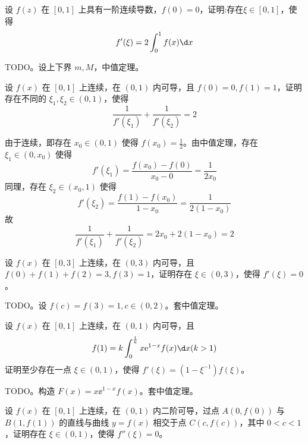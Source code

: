 \begin{problem}[000009]
设 $f(z)$ 在 $[0,1]$ 上具有一阶连续导数，$f(0) = 0$，证明:存在$\xi \in [0,1]$，使得
\[ f'(\xi) = 2\int_0^1f(x) \d x \]
\end{problem}

\begin{solution}
	TODO。设上下界 $m, M$，中值定理。
\end{solution}

\begin{problem}[000010]
设 $f(x)$ 在 $[0, 1]$ 上连续，在 $(0, 1)$ 内可导，且 $f(0) = 0, f(1) = 1$，证明存在不同的 $\xi_1, \xi_2 \in (0, 1)$，使得
\[ \frac{1}{f'(\xi_1)} + \frac{1}{f'(\xi_2)} = 2 \]
\end{problem}

\begin{solution}
	由于连续，即存在 $x_0 \in (0, 1)$ 使得 $f(x_0) = \frac{1}{2}$。由中值定理，存在 $\xi_1 \in (0, x_0)$ 使得
	\[ f'(\xi_1) = \frac{f(x_0) - f(0)}{x_0 - 0} = \frac{1}{2x_0}
	\]
	同理，存在 $\xi_2 \in (x_0, 1)$ 使得
	\[ f'(\xi_2) = \frac{f(1) - f(x_0)}{1 - x_0} = \frac{1}{2(1 -x_0)} \]
	故
	\[ \frac{1}{f'(\xi_1)} + \frac{1}{f'(\xi_2)} = 2x_0 + 2(1 - x_0) = 2 \]

\end{solution}

\begin{problem}[000011]
设 $f(x)$ 在 $[0, 3]$ 上连续，在 $(0, 3)$ 内可导，且 $f(0) + f(1) + f(2) = 3, f(3) = 1$，证明存在 $\xi \in (0, 3)$，使得 $f'(\xi) = 0$。
\end{problem}

\begin{solution}
	TODO。设 $f(c) = f(3) = 1, c \in (0, 2)$。套中值定理。
\end{solution}

\begin{problem}[000012]
设 $f(x)$ 在 $[0, 1]$ 上连续，在 $(0, 1)$ 内可导，且
\[ f(1) = k \int_{0}^{\frac{1}{k}} x \ee^{1-x} f(x) \d x (k > 1) \]
证明至少存在一点 $\xi \in (0, 1)$，使得 $f'(\xi) = (1 - \xi^{-1})f(\xi)$。
\end{problem}

\begin{solution}
	TODO。构造 $F(x) = x \ee^{1-x} f(x)$。套中值定理。
\end{solution}

\begin{problem}[000013]
设 $f(x)$ 在 $[0, 1]$ 上连续，在 $(0, 1)$ 内二阶可导，过点 $A(0, f(0))$ 与 $B(1, f(1))$ 的直线与曲线 $y=f(x)$ 相交于点 $C(c, f(c))$，其中 $0 < c < 1$，证明存在 $\xi \in (0, 1)$，使得 $f''(\xi) = 0$。
\end{problem}

